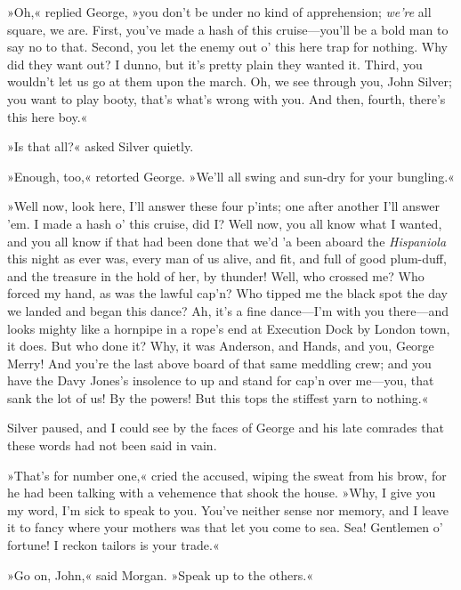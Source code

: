 »Oh,« replied George, »you don't be under no kind of apprehension; \textit{we're} all square, we are. First, you've made a hash of this cruise—you'll be a bold man to say no to that. Second, you let the enemy out o' this here trap for nothing. Why did they want out? I dunno, but it's pretty plain they wanted it. Third, you wouldn't let us go at them upon the march. Oh, we see through you, John Silver; you want to play booty, that's what's wrong with you. And then, fourth, there's this here boy.«

»Is that all?« asked Silver quietly.

»Enough, too,« retorted George. »We'll all swing and sun-dry for your bungling.«

»Well now, look here, I'll answer these four p'ints; one after another I'll answer 'em. I made a hash o' this cruise, did I? Well now, you all know what I wanted, and you all know if that had been done that we'd 'a been aboard the \textit{Hispaniola} this night as ever was, every man of us alive, and fit, and full of good plum-duff, and the treasure in the hold of her, by thunder! Well, who crossed me? Who forced my hand, as was the lawful cap'n? Who tipped me the black spot the day we landed and began this dance? Ah, it's a fine dance—I'm with you there—and looks mighty like a hornpipe in a rope's end at Execution Dock by London town, it does. But who done it? Why, it was Anderson, and Hands, and you, George Merry! And you're the last above board of that same meddling crew; and you have the Davy Jones's insolence to up and stand for cap'n over me—you, that sank the lot of us! By the powers! But this tops the stiffest yarn to nothing.«

Silver paused, and I could see by the faces of George and his late comrades that these words had not been said in vain.

»That's for number one,« cried the accused, wiping the sweat from his brow, for he had been talking with a vehemence that shook the house. »Why, I give you my word, I'm sick to speak to you. You've neither sense nor memory, and I leave it to fancy where your mothers was that let you come to sea. Sea! Gentlemen o' fortune! I reckon tailors is your trade.«

»Go on, John,« said Morgan. »Speak up to the others.«

